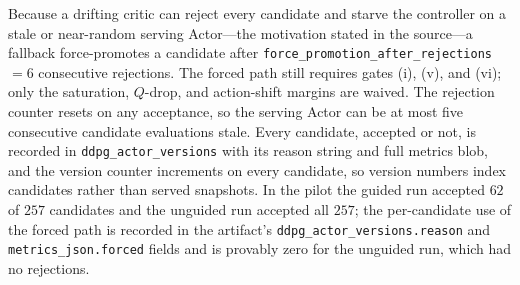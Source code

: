 Because a drifting critic can reject every candidate and starve the controller on a stale or near-random serving Actor---the motivation stated in the source---a fallback force-promotes a candidate after \texttt{force\_promotion\_after\_rejections}${}=6$ consecutive rejections. The forced path still requires gates (i), (v), and (vi); only the saturation, $Q$-drop, and action-shift margins are waived. The rejection counter resets on any acceptance, so the serving Actor can be at most five consecutive candidate evaluations stale. Every candidate, accepted or not, is recorded in \texttt{ddpg\_actor\_versions} with its reason string and full metrics blob, and the version counter increments on every candidate, so version numbers index candidates rather than served snapshots. In the pilot the guided run accepted $62$ of $257$ candidates and the unguided run accepted all $257$; the per-candidate use of the forced path is recorded in the artifact's \texttt{ddpg\_actor\_versions.reason} and \texttt{metrics\_json.forced} fields and is provably zero for the unguided run, which had no rejections.

